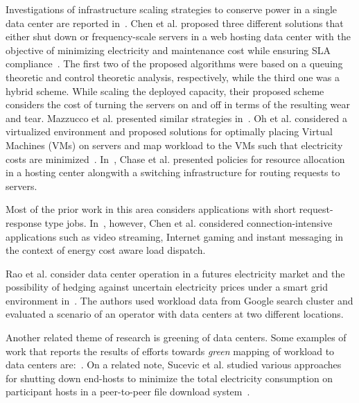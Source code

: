 Investigations of infrastructure scaling strategies to conserve power in a single data center are reported in~\cite{serverEnergy,Mazzucco:Maximizing:2011:CoRR,Oh:2011:ECS:2170444.2170458,Chase:2001:MES:502059.502045}. Chen et al. proposed three different solutions that either shut down or frequency-scale servers in a web hosting data center with the objective of minimizing electricity and maintenance cost while ensuring SLA compliance~\cite{serverEnergy}. The first two of the proposed algorithms were based on a queuing theoretic and control theoretic analysis, respectively, while the third one was a hybrid scheme. While scaling the deployed capacity, their proposed scheme considers the cost of turning the servers on and off in terms of the resulting wear and tear. Mazzucco et al. presented similar strategies in~\cite{Mazzucco:Maximizing:2011:CoRR}. Oh et al. considered a virtualized environment and proposed solutions for optimally placing Virtual Machines (VMs) on servers and map workload to the VMs such that electricity costs are minimized~\cite{Oh:2011:ECS:2170444.2170458}. In~\cite{Chase:2001:MES:502059.502045}, Chase et al. presented policies for resource allocation in a hosting center alongwith a switching infrastructure for routing requests to servers.

Most of the prior work in this area considers applications with short request-response type jobs. In~\cite{Chen:2008:ESP:1387589.1387613}, however, Chen et al. considered connection-intensive applications such as video streaming, Internet gaming and instant messaging in the context of energy cost aware load dispatch. 

Rao et al. consider data center operation in a futures electricity market and the possibility of hedging against uncertain electricity prices under a smart grid environment in~\cite{Rao:2011:TSG}. The authors used workload data from Google search cluster and evaluated a scenario of an operator with data centers at two different locations.

Another related theme of research is greening of data centers. Some examples of work that reports the results of efforts towards \textit{green} mapping of workload to data centers are:~\cite{Le:HotPower:2009,Zheng2011275,Koutitas:2010:JGE,abbasi2011dahm,chiaraviglio2010greencoop,Phan:2012:GECCO,Liu:2011:SIGMETRICS,Liu:2011:GREENMETRICS}. On a related note, Sucevic et al. studied various approaches for shutting down end-hosts to minimize the total electricity consumption on participant hosts in a peer-to-peer file download system~\cite{Sucevic:2011:PDE:2160803.2160864}.


